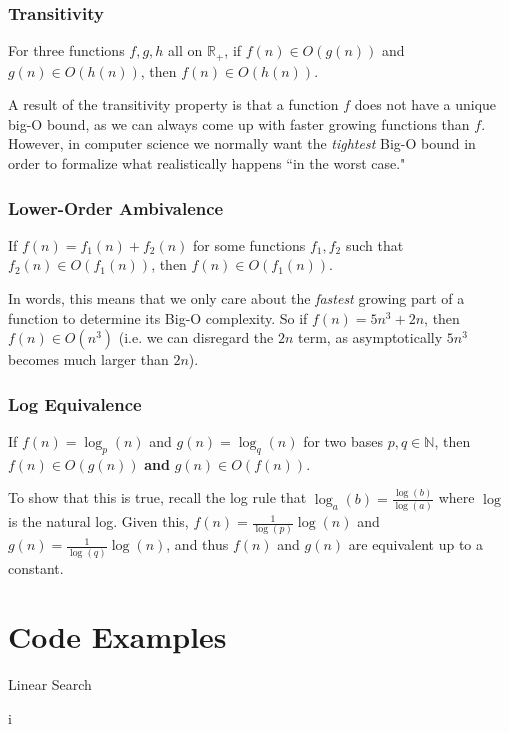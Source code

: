\subsubsection{Transitivity}
\begin{definition}[Transitivity]\label{def:bigO::trans}
    For three functions $f, g, h$ all on $\mathbb{R}_+$, if $f(n) \in O(g(n))$ and $g(n) \in O(h(n))$, then $f(n) \in O(h(n))$.
\end{definition}

A result of the transitivity property is that a function $f$ does not have a unique big-O bound, as we can always come up with faster growing functions than $f$. However, in computer science we normally want the \emph{tightest} Big-O bound in order to formalize what realistically happens ``in the worst case."


\subsubsection{Lower-Order Ambivalence}
\begin{definition}\label{def:bigO::loa}
    If $f(n) = f_1(n) + f_2(n)$ for some functions $f_1, f_2$ such that $f_2(n) \in O(f_1(n))$, then $f(n) \in O(f_1(n))$.
\end{definition}

In words, this means that we only care about the \emph{fastest} growing part of a function to determine its Big-O complexity. So if $f(n) = 5n^3 + 2n$, then $f(n) \in O(n^3)$ (i.e. we can disregard the $2n$ term, as asymptotically $5n^3$ becomes much larger than $2n$).


\subsubsection{Log Equivalence}
\begin{definition}\label{def:bigO::le}
    If $f(n) = \log_p(n)$ and $g(n) = \log_q(n)$ for two bases $p, q \in \mathbb{N}$, then $f(n) \in O(g(n))$ \textbf{and} $g(n) \in O(f(n))$.
\end{definition}

To show that this is true, recall the log rule that $\log_a(b) = \frac{\log(b)}{\log(a)}$ where $\log$ is the natural log. Given this, $f(n) = \frac{1}{\log(p)}\log(n)$ and $g(n) = \frac{1}{\log(q)}\log(n)$, and thus $f(n)$ and $g(n)$ are equivalent up to a constant.

\section{Code Examples}

\begin{algorithm}[H]
    \caption{Linear Search}
    \label{alg:log-sum-exp-trick}
    \begin{algorithmic}[1]
                \Return i
                \EndIf
            \EndFor
        \EndProcedure
    \end{algorithmic}
\end{algorithm}